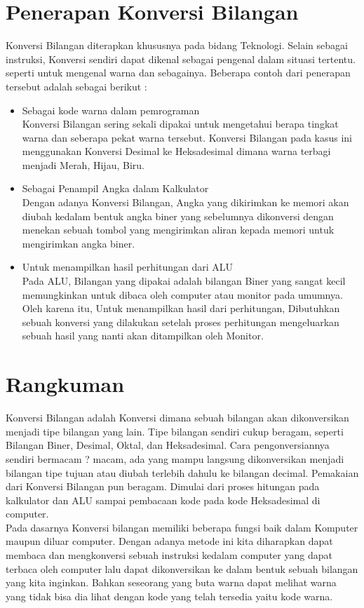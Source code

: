 {\begin{itemize}
\begin{itemize}
\section{Penerapan Konversi Bilangan} %
Konversi Bilangan diterapkan khususnya pada bidang Teknologi. Selain sebagai instruksi, Konversi sendiri dapat dikenal sebagai pengenal dalam situasi tertentu. seperti untuk mengenal warna dan sebagainya. Beberapa contoh dari penerapan tersebut adalah sebagai berikut : 
\begin{itemize}
	\item Sebagai kode warna dalam pemrograman \\ Konversi Bilangan sering sekali dipakai untuk mengetahui berapa tingkat warna dan seberapa pekat warna tersebut. Konversi Bilangan pada kasus ini menggunakan Konversi Desimal ke Heksadesimal dimana warna terbagi menjadi Merah, Hijau, Biru. 
	\item Sebagai Penampil Angka dalam Kalkulator \\ Dengan adanya Konversi Bilangan, Angka yang dikirimkan ke memori akan diubah kedalam bentuk angka biner yang sebelumnya dikonversi dengan menekan sebuah tombol yang mengirimkan aliran kepada memori untuk mengirimkan angka biner.
	\item Untuk menampilkan hasil perhitungan dari ALU \\ Pada ALU, Bilangan yang dipakai adalah bilangan Biner yang sangat kecil memungkinkan untuk dibaca oleh computer atau monitor pada umumnya. Oleh karena itu, Untuk menampilkan hasil dari perhitungan, Dibutuhkan sebuah konversi yang dilakukan setelah proses perhitungan mengeluarkan sebuah hasil yang nanti akan ditampilkan oleh Monitor.
\end{itemize}

\section{Rangkuman} %
Konversi Bilangan adalah Konversi dimana sebuah bilangan akan dikonversikan menjadi tipe bilangan yang lain. Tipe bilangan sendiri cukup beragam, seperti Bilangan Biner, Desimal, Oktal, dan Heksadesimal. Cara pengonversiannya sendiri bermacam ? macam, ada yang mampu langsung dikonversikan menjadi bilangan tipe tujuan atau diubah terlebih dahulu ke bilangan decimal. Pemakaian dari Konversi Bilangan pun beragam. Dimulai dari proses hitungan pada kalkulator dan ALU sampai pembacaan kode pada kode Heksadesimal di computer. 
\\Pada dasarnya Konversi bilangan memiliki beberapa fungsi baik dalam Komputer maupun diluar computer. Dengan adanya metode ini kita diharapkan dapat membaca dan mengkonversi sebuah instruksi kedalam computer yang dapat terbaca oleh computer lalu dapat dikonversikan ke dalam bentuk sebuah bilangan yang kita inginkan. Bahkan seseorang yang buta warna dapat melihat warna yang tidak bisa dia lihat dengan kode yang telah tersedia yaitu kode warna. 


\end{itemize}
\end{itemize}}
